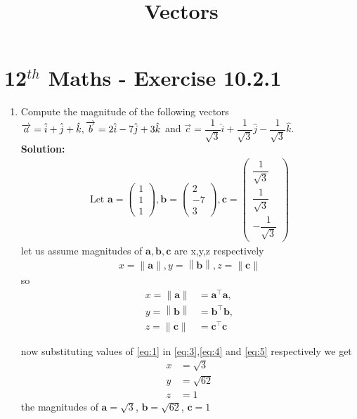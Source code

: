 \documentclass[12pt]{article}
\providecommand{\norm}[1]{\left\lVert#1\right\rVert}
\newcommand{\solution}{\noindent \textbf{Solution: }}
\newcommand{\myvec}[1]{\ensuremath{\begin{pmatrix}#1\end{pmatrix}}}
\let\vec\mathbf
\begin{document}
\begin{center}
\title{\textbf{Vectors}}
\date{\vspace{-5ex}} %
\maketitle
\end{center}
\setcounter{page}{1}
\section*{12$^{th}$ Maths - Exercise 10.2.1}

\begin{enumerate}
\item Compute the magnitude of the following vectors 
$\\ \overrightarrow{a}=\hat{i}+\hat{j}+\hat{k},\overrightarrow{b}=2\hat{i}-7\hat{j}+3\hat{k}$ and $\overrightarrow{c}=\dfrac{1}{\sqrt{3}}\hat{i}+\dfrac{1}{\sqrt{3}}\hat{j}-\dfrac{1}{\sqrt{3}}\hat{k}$.\\
\solution
\begin{align}
\text{Let } \vec{a} = \myvec{1\\1\\1} , \vec{b} = \myvec{2\\ -7 \\ 3},\vec{c} = \myvec{\dfrac{1}{\sqrt{3}}\\ \dfrac{1}{\sqrt{3}} \\ -\dfrac{1}{\sqrt{3}}} 
\label{eq:1}
\end{align}
let us assume magnitudes of $\vec{a},\vec{b},\vec{c}$ are x,y,z respectively
\begin{align}
	x=\norm{\vec{a}} ,
	y=\norm{\vec{b}} ,
	z=\norm{\vec{c}}
	\label{eq:2}
\end{align}
so
\begin{align}
	x=\norm{\vec{a}}&={\vec{a}}^{\top}\vec{a}, 
	\label{eq:3}
	\\ y=\norm{\vec{b}}&={\vec{b}}^{\top}\vec{b}, 
	\label{eq:4}
	\\ z=\norm{\vec{c}}&={\vec{c}}^{\top}\vec{c}	
	\label{eq:5}
\end{align}

now substituting values of \eqref{eq:1} in \eqref{eq:3},\eqref{eq:4} and \eqref{eq:5} respectively we get
\begin{align}
	x&=\sqrt{3}
\\	y&=\sqrt{62}
\\	z&=1	
\end{align}
the magnitudes of $\vec{a}=\sqrt{3}$, $\vec{b}= \sqrt{62}$, $\vec{c}=1$

\end{enumerate}
\end{document}
